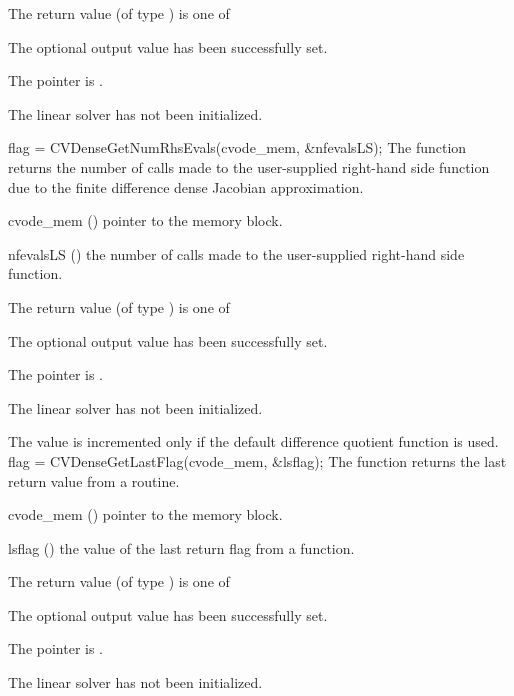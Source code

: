 {
  The return value  (of type ) is one of
  \begin{args}
  \item[\Id{CVDENSE\_SUCCESS}] 
    The optional output value has been successfully set.
  \item[\Id{CVDENSE\_MEM\_NULL}]
    The  pointer is .
  \item[\Id{CVDENSE\_LMEM\_NULL}]
    The {\cvdense} linear solver has not been initialized.
  \end{args}
}
{}
{
  flag = CVDenseGetNumRhsEvals(cvode\_mem, \&nfevalsLS);
}
{
  The function  returns the
  number of calls made to the user-supplied right-hand side function due to the 
  finite difference dense Jacobian approximation.
}
{
  \begin{args}
  \item[cvode\_mem] ()
    pointer to the {\cvodes} memory block.
  \item[nfevalsLS] ()
    the number of calls made to the user-supplied right-hand side function.
  \end{args}
}
{
  The return value  (of type ) is one of
  \begin{args}
  \item[\Id{CVDENSE\_SUCCESS}] 
    The optional output value has been successfully set.
  \item[\Id{CVDENSE\_MEM\_NULL}]
    The  pointer is .
  \item[\Id{CVDENSE\_LMEM\_NULL}]
    The {\cvdense} linear solver has not been initialized.
  \end{args}
}
{
  The value  is incremented only if the default 
   difference quotient function is used.
}
{
  flag = CVDenseGetLastFlag(cvode\_mem, \&lsflag);
}
{
  The function  returns the
  last return value from a {\cvdense} routine. 
}
{
  \begin{args}
  \item[cvode\_mem] ()
    pointer to the {\cvodes} memory block.
  \item[lsflag] ()
    the value of the last return flag from a {\cvdense} function.
  \end{args}
}
{
  The return value  (of type ) is one of
  \begin{args}
  \item[\Id{CVDENSE\_SUCCESS}] 
    The optional output value has been successfully set.
  \item[\Id{CVDENSE\_MEM\_NULL}]
    The  pointer is .
  \item[\Id{CVDENSE\_LMEM\_NULL}]
    The {\cvdense} linear solver has not been initialized.
  \end{args}
}
